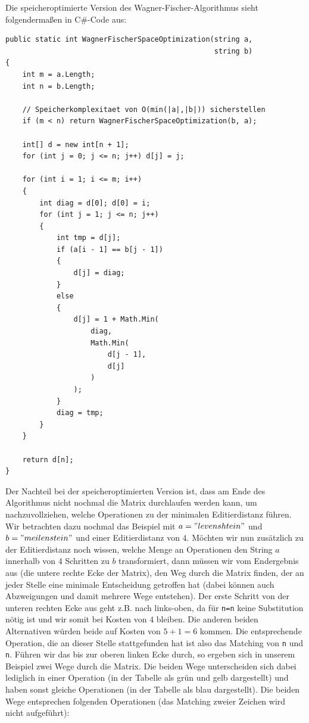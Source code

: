 \documentclass{whswinvcbook}
\begin{document}
Die speicheroptimierte Version des Wagner-Fischer-Algorithmus sieht folgendermaßen in C\#-Code aus:
\begin{lstlisting}[caption=Wagner-Fischer-Algorithmus mit Speicheroptimierung, label=lst:wagner_fischer_space]
public static int WagnerFischerSpaceOptimization(string a,
                                                 string b)
{
    int m = a.Length;
    int n = b.Length;

    // Speicherkomplexitaet von O(min(|a|,|b|)) sicherstellen
    if (m < n) return WagnerFischerSpaceOptimization(b, a);

    int[] d = new int[n + 1];
    for (int j = 0; j <= n; j++) d[j] = j;

    for (int i = 1; i <= m; i++)
    {
        int diag = d[0]; d[0] = i;
        for (int j = 1; j <= n; j++)
        {
            int tmp = d[j];
            if (a[i - 1] == b[j - 1])
            {
                d[j] = diag;
            }
            else
            {
                d[j] = 1 + Math.Min(
                    diag,
                    Math.Min(
                        d[j - 1],
                        d[j]
                    )
                );
            }
            diag = tmp;
        }
    }

    return d[n];
}
\end{lstlisting}
Der Nachteil bei der speicheroptimierten Version ist, dass am Ende des Algorithmus nicht nochmal die Matrix durchlaufen werden kann, um nachzuvollziehen, welche Operationen zu der minimalen Editierdistanz führen. Wir betrachten dazu nochmal das Beispiel mit $a="levenshtein"$ und $b="meilenstein"$ und einer Editierdistanz von $4$. Möchten wir nun zusätzlich zu der Editierdistanz noch wissen, welche Menge an Operationen den String $a$ innerhalb von $4$ Schritten zu $b$ transformiert, dann müssen wir vom Endergebnis aus (die untere rechte Ecke der Matrix), den Weg durch die Matrix finden, der an jeder Stelle eine minimale Entscheidung getroffen hat (dabei können auch Abzweigungen und damit mehrere Wege entstehen). Der erste Schritt von der unteren rechten Ecke aus geht z.B. nach links-oben, da für \texttt{n=n} keine Substitution nötig ist und wir somit bei Kosten von $4$ bleiben. Die anderen beiden Alternativen würden beide auf Kosten von $5+1=6$ kommen. Die entsprechende Operation, die an dieser Stelle stattgefunden hat ist also das Matching von \texttt{n} und \texttt{n}. Führen wir das bis zur oberen linken Ecke durch, so ergeben sich in unserem Beispiel zwei Wege durch die Matrix. Die beiden Wege unterscheiden sich dabei lediglich in einer Operation (in der Tabelle als grün und gelb dargestellt) und haben sonst gleiche Operationen (in der Tabelle als blau dargestellt). Die beiden Wege entsprechen folgenden Operationen (das Matching zweier Zeichen wird nicht aufgeführt):
\end{document}
